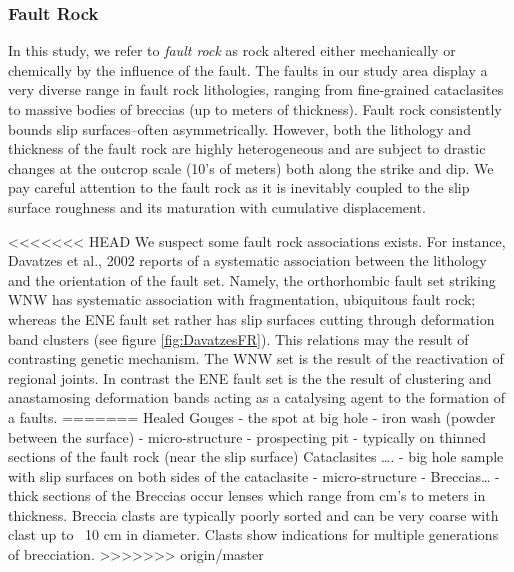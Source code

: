 \documentclass[12pt,a4paper]{article}
\begin{document}
{\subsubsection{Fault Rock} 


    

	


In this study, we refer to \textit{fault rock} as rock altered either mechanically or chemically by the influence of the fault. The faults in our study area display a very diverse range in fault rock lithologies, ranging from fine-grained cataclasites to massive  bodies of breccias (up to meters of thickness). Fault rock consistently bounds slip surfaces--often asymmetrically.  However,  both the lithology and thickness of the fault rock are highly heterogeneous and are subject to drastic changes at the outcrop scale (10’s of meters) both along the strike and dip. We pay careful attention to the fault rock as it is inevitably coupled to the slip surface roughness and its maturation with cumulative displacement. 

<<<<<<< HEAD
We suspect some fault rock associations exists. For instance, Davatzes et al., 2002 reports of a systematic association between the lithology and the orientation of the fault set. Namely, the orthorhombic fault set striking WNW has systematic association with fragmentation, ubiquitous fault rock; whereas the ENE fault set rather has slip surfaces cutting through deformation band clusters (see figure \ref{fig:DavatzesFR}). This relations may the result of contrasting genetic mechanism. The WNW set is the result of the reactivation of regional joints. In contrast the ENE fault set is the the result of clustering and anastamosing deformation bands acting as a catalysing agent to the formation of a faults.
=======
Healed Gouges
-	the spot at big hole
-	iron wash (powder between the surface)
-	micro-structure
-	prospecting pit
-	typically on thinned sections of the fault rock (near the slip surface)
Cataclasites ….
-	big hole sample with slip surfaces on both sides of the cataclasite
-	micro-structure
-	
Breccias…
-	thick sections  of the 
Breccias occur lenses which range from cm’s to meters in thickness. Breccia clasts are typically poorly sorted and can be very coarse with clast up to ~10 cm in diameter. Clasts show indications for multiple generations of brecciation.
>>>>>>> origin/master

}
\end{document}

